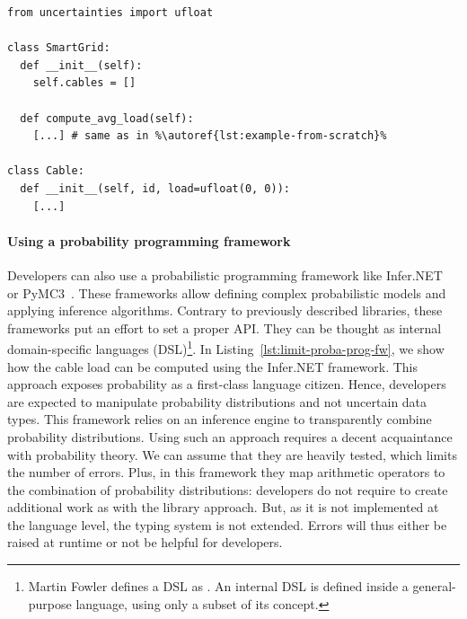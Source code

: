 %
%
%
\begin{lstlisting}[style=pythonStyle, caption=Managing uncertainty in Python using uncertainties~\cite{url:uncertainties}, label=lst:example-python-uncertainties, linewidth=0.97\textwidth, escapechar=\%]
from uncertainties import ufloat

class SmartGrid:
  def __init__(self):
    self.cables = []

  def compute_avg_load(self):
    [...] # same as in %\autoref{lst:example-from-scratch}%

class Cable:
  def __init__(self, id, load=ufloat(0, 0)):
    [...]
\end{lstlisting}

\paragraph{Using a probability programming framework}
Developers can also use a probabilistic programming framework like Infer.NET~\cite{url:InferNET18} or PyMC3~\cite{DBLP:journals/peerj-cs/SalvatierWF16}.
These frameworks allow defining complex probabilistic models and applying inference algorithms.
Contrary to previously described libraries, these frameworks put an effort to set a proper API.
They can be thought as internal domain-specific languages (DSL)\cite{fowler2010domain}\footnote{Martin Fowler defines a DSL as \cite{fowler2010domain}. An internal DSL is defined inside a general-purpose language, using only a subset of its concept.}.
In Listing~\ref{lst:limit-proba-prog-fw}, we show how the cable load can be computed using the Infer.NET framework.
This approach exposes probability as a first-class language citizen. 
Hence, developers are expected to manipulate probability distributions and not uncertain data types. 
This framework relies on an inference engine to transparently combine probability distributions.
Using such an approach requires a decent acquaintance with probability theory.
We can assume that they are heavily tested, which limits the number of errors.
Plus, in this framework they map arithmetic operators to the combination of probability distributions: developers do not require to create additional work as with the library approach.
But, as it is not implemented at the language level, the typing system is not extended.
Errors will thus either be raised at runtime or not be helpful for developers.


